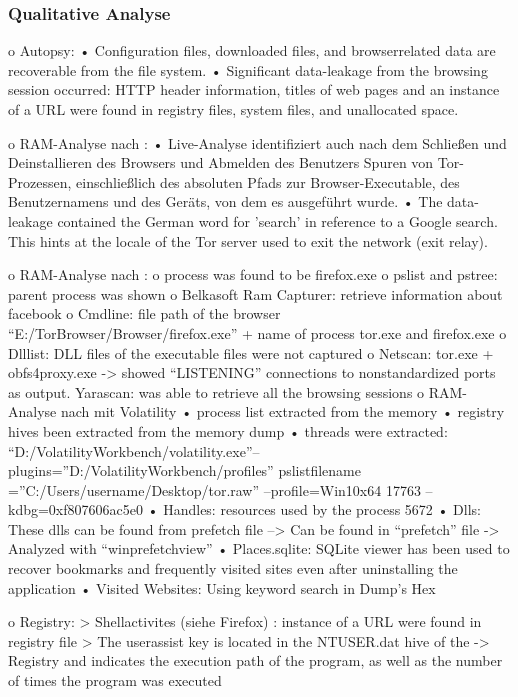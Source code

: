 \subsubsection*{Qualitative Analyse}

o Autopsy: \cite{Muir.2019}
	•	Configuration files, downloaded files, and browserrelated data are recoverable from the file system.
	•	Significant data-leakage from the browsing session occurred: HTTP header information, titles of web pages and an instance of a URL were found in registry files, system files, and unallocated space.



o RAM-Analyse nach \cite{Muir.2019}:
	•	Live-Analyse identifiziert auch nach dem Schließen und Deinstallieren des Browsers und Abmelden des Benutzers Spuren von Tor-Prozessen, einschließlich des absoluten Pfads zur Browser-Executable, des Benutzernamens und des Geräts, von dem es ausgeführt wurde.
	•	The data-leakage contained the German word for ’search’ in reference to a Google search. This hints at the locale of the Tor server used to exit the network (exit relay).

o RAM-Analyse nach \cite{Hariharan.2022}:
	o	process was found to be firefox.exe
	o	pslist and pstree: parent process was shown 
	o	Belkasoft Ram Capturer: retrieve information about facebook
	o	Cmdline: file path of the browser “E:/TorBrowser/Browser/firefox.exe” + name of process tor.exe and firefox.exe
	o	Dlllist: DLL files of the executable files were not captured
	o	Netscan: tor.exe + obfs4proxy.exe -> showed “LISTENING” connections to nonstandardized ports as output.
	Yarascan: was able to retrieve all the browsing sessions
o RAM-Analyse nach \cite{Sajan.2021} mit Volatility
	•	process list extracted from the memory
	•	registry hives been extracted from the memory dump
	•	threads were extracted: “D:/VolatilityWorkbench/volatility.exe”–plugins=”D:/VolatilityWorkbench/profiles” pslistfilename =”C:/Users/username/Desktop/tor.raw” –profile=Win10x64 17763 –kdbg=0xf807606ac5e0
	•	Handles: resources used by the process 5672
	•	Dlls: These dlls can be found from prefetch file --> Can be found in “prefetch” file -> Analyzed with “winprefetchview”
	•	Places.sqlite: SQLite viewer has been used to recover bookmarks and frequently visited sites even after uninstalling the application
	•	Visited Websites: Using keyword search in Dump’s Hex

o Registry:
	> Shellactivites (siehe Firefox) \cite{Muir.2019}: instance of a URL were found in registry file
	> \cite{Nelson.2020} The userassist key is located in the NTUSER.dat hive of the
		 -> Registry and indicates the execution path of the program, as well as the number of times the program was executed 

